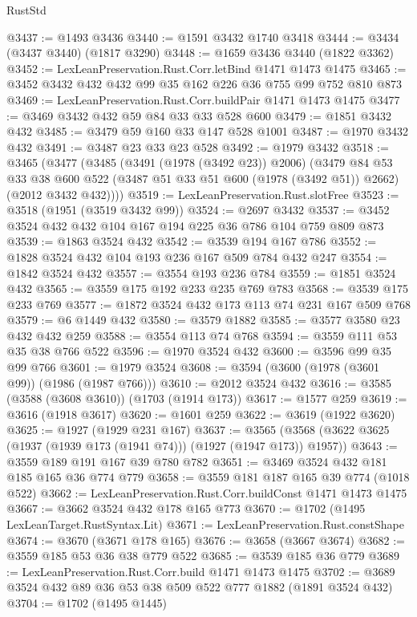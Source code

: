 \begin{lexlean}{RustStd}
\begin{coremodule}
@3437 := @1493 @3436
@3440 := @1591 @3432 @1740 @3418
@3444 := @3434 (@3437 @3440) (@1817 @3290)
@3448 := @1659 @3436 @3440 (@1822 @3362)
@3452 := LexLeanPreservation.Rust.Corr.letBind @1471 @1473 @1475
@3465 := @3452 @3432 @432 @432 @99 @35 @162 @226 @36 @755 @99 @752 @810 @873
@3469 := LexLeanPreservation.Rust.Corr.buildPair @1471 @1473 @1475
@3477 := @3469 @3432 @432 @59 @84 @33 @33 @528 @600
@3479 := @1851 @3432 @432
@3485 := @3479 @59 @160 @33 @147 @528 @1001
@3487 := @1970 @3432 @432
@3491 := @3487 @23 @33 @23 @528
@3492 := @1979 @3432
@3518 := @3465
    (@3477
      (@3485
        (@3491 (@1978 (@3492 @23)) @2006)
        (@3479
          @84
          @53
          @33
          @38
          @600
          @522
          (@3487 @51 @33 @51 @600 (@1978 (@3492 @51)) @2662)
          (@2012 @3432 @432))))
@3519 := LexLeanPreservation.Rust.slotFree
@3523 := @3518 (@1951 (@3519 @3432 @99))
@3524 := @2697 @3432
@3537 := @3452 @3524 @432 @432 @104 @167 @194 @225 @36 @786 @104 @759 @809 @873
@3539 := @1863 @3524 @432
@3542 := @3539 @194 @167 @786
@3552 := @1828 @3524 @432 @104 @193 @236 @167 @509 @784 @432 @247
@3554 := @1842 @3524 @432
@3557 := @3554 @193 @236 @784
@3559 := @1851 @3524 @432
@3565 := @3559 @175 @192 @233 @235 @769 @783
@3568 := @3539 @175 @233 @769
@3577 := @1872 @3524 @432 @173 @113 @74 @231 @167 @509 @768
@3579 := @6 @1449 @432
@3580 := @3579 @1882
@3585 := @3577 @3580 @23 @432 @432 @259
@3588 := @3554 @113 @74 @768
@3594 := @3559 @111 @53 @35 @38 @766 @522
@3596 := @1970 @3524 @432
@3600 := @3596 @99 @35 @99 @766
@3601 := @1979 @3524
@3608 := @3594 (@3600 (@1978 (@3601 @99)) (@1986 (@1987 @766)))
@3610 := @2012 @3524 @432
@3616 := @3585 (@3588 (@3608 @3610)) (@1703 (@1914 @173))
@3617 := @1577 @259
@3619 := @3616 (@1918 @3617)
@3620 := @1601 @259
@3622 := @3619 (@1922 @3620)
@3625 := @1927 (@1929 @231 @167)
@3637 := @3565 (@3568 (@3622 @3625 (@1937 (@1939 @173 (@1941 @74))) (@1927 (@1947 @173)) @1957))
@3643 := @3559 @189 @191 @167 @39 @780 @782
@3651 := @3469 @3524 @432 @181 @185 @165 @36 @774 @779
@3658 := @3559 @181 @187 @165 @39 @774 (@1018 @522)
@3662 := LexLeanPreservation.Rust.Corr.buildConst @1471 @1473 @1475
@3667 := @3662 @3524 @432 @178 @165 @773
@3670 := @1702 (@1495 LexLeanTarget.RustSyntax.Lit)
@3671 := LexLeanPreservation.Rust.constShape
@3674 := @3670 (@3671 @178 @165)
@3676 := @3658 (@3667 @3674)
@3682 := @3559 @185 @53 @36 @38 @779 @522
@3685 := @3539 @185 @36 @779
@3689 := LexLeanPreservation.Rust.Corr.build @1471 @1473 @1475
@3702 := @3689 @3524 @432 @89 @36 @53 @38 @509 @522 @777 @1882 (@1891 @3524 @432)
@3704 := @1702 (@1495 @1445)

\end{coremodule}
\end{lexlean}
